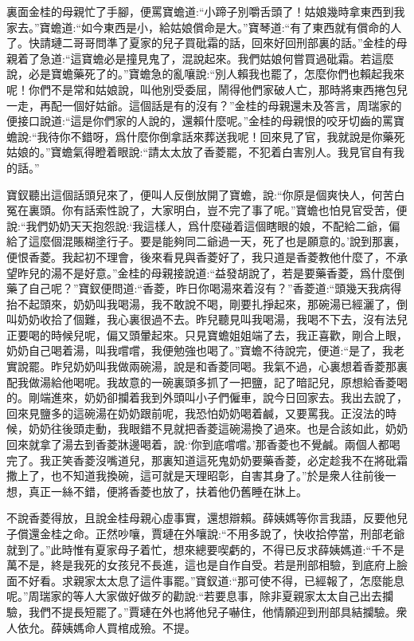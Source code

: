 \begin{parag}
    裏面金桂的母親忙了手腳，便罵寶蟾道:“小蹄子別嚼舌頭了！姑娘幾時拿東西到我家去。”寶蟾道:“如今東西是小，給姑娘償命是大。”寶琴道:“有了東西就有償命的人了。快請璉二哥哥問準了夏家的兒子買砒霜的話，回來好回刑部裏的話。”金桂的母親着了急道:“這寶蟾必是撞見鬼了，混說起來。我們姑娘何嘗買過砒霜。若這麼說，必是寶蟾藥死了的。”寶蟾急的亂嚷說:“別人賴我也罷了，怎麼你們也賴起我來呢！你們不是常和姑娘說，叫他別受委屈，鬧得他們家破人亡，那時將東西捲包兒一走，再配一個好姑爺。這個話是有的沒有？”金桂的母親還未及答言，周瑞家的便接口說道:“這是你們家的人說的，還賴什麼呢。”金桂的母親恨的咬牙切齒的罵寶蟾說:“我待你不錯呀，爲什麼你倒拿話來葬送我呢！回來見了官，我就說是你藥死姑娘的。”寶蟾氣得瞪着眼說:“請太太放了香菱罷，不犯着白害別人。我見官自有我的話。”
\end{parag}


\begin{parag}
    寶釵聽出這個話頭兒來了，便叫人反倒放開了寶蟾，說:“你原是個爽快人，何苦白冤在裏頭。你有話索性說了，大家明白，豈不完了事了呢。”寶蟾也怕見官受苦，便說:“我們奶奶天天抱怨說:‘我這樣人，爲什麼碰着這個瞎眼的娘，不配給二爺，偏給了這麼個混賬糊塗行子。要是能夠同二爺過一天，死了也是願意的。’說到那裏，便恨香菱。我起初不理會，後來看見與香菱好了，我只道是香菱教他什麼了，不承望昨兒的湯不是好意。”金桂的母親接說道:“益發胡說了，若是要藥香菱，爲什麼倒藥了自己呢？”寶釵便問道:“香菱，昨日你喝湯來着沒有？”香菱道:“頭幾天我病得抬不起頭來，奶奶叫我喝湯，我不敢說不喝，剛要扎掙起來，那碗湯已經灑了，倒叫奶奶收拾了個難，我心裏很過不去。昨兒聽見叫我喝湯，我喝不下去，沒有法兒正要喝的時候兒呢，偏又頭暈起來。只見寶蟾姐姐端了去，我正喜歡，剛合上眼，奶奶自己喝着湯，叫我嚐嚐，我便勉強也喝了。”寶蟾不待說完，便道:“是了，我老實說罷。昨兒奶奶叫我做兩碗湯，說是和香菱同喝。我氣不過，心裏想着香菱那裏配我做湯給他喝呢。我故意的一碗裏頭多抓了一把鹽，記了暗記兒，原想給香菱喝的。剛端進來，奶奶卻攔着我到外頭叫小子們僱車，說今日回家去。我出去說了，回來見鹽多的這碗湯在奶奶跟前呢，我恐怕奶奶喝着鹹，又要罵我。正沒法的時候，奶奶往後頭走動，我眼錯不見就把香菱這碗湯換了過來。也是合該如此，奶奶回來就拿了湯去到香菱牀邊喝着，說:‘你到底嚐嚐。’那香菱也不覺鹹。兩個人都喝完了。我正笑香菱沒嘴道兒，那裏知道這死鬼奶奶要藥香菱，必定趁我不在將砒霜撒上了，也不知道我換碗，這可就是天理昭彰，自害其身了。”於是衆人往前後一想，真正一絲不錯，便將香菱也放了，扶着他仍舊睡在牀上。
\end{parag}


\begin{parag}
    不說香菱得放，且說金桂母親心虛事實，還想辯賴。薛姨媽等你言我語，反要他兒子償還金桂之命。正然吵嚷，賈璉在外嚷說:“不用多說了，快收拾停當，刑部老爺就到了。”此時惟有夏家母子着忙，想來總要喫虧的，不得已反求薛姨媽道:“千不是萬不是，終是我死的女孩兒不長進，這也是自作自受。若是刑部相驗，到底府上臉面不好看。求親家太太息了這件事罷。”寶釵道:“那可使不得，已經報了，怎麼能息呢。”周瑞家的等人大家做好做歹的勸說:“若要息事，除非夏親家太太自己出去攔驗，我們不提長短罷了。”賈璉在外也將他兒子嚇住，他情願迎到刑部具結攔驗。衆人依允。薛姨媽命人買棺成殮。不提。
\end{parag}


